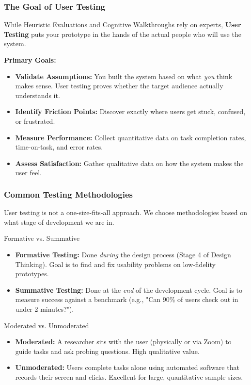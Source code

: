 \documentclass[xcolor=table]{beamer}
\begin{document}
\begin{frame}
    \frametitle{The Goal of User Testing}
    While Heuristic Evaluations and Cognitive Walkthroughs rely on experts, \textbf{User Testing} puts your prototype in the hands of the actual people who will use the system.
    
    \vspace{0.3cm}
    \textbf{Primary Goals:}
    \begin{itemize}
        \item \textbf{Validate Assumptions:} You built the system based on what \textit{you} think makes sense. User testing proves whether the target audience actually understands it.
        \item \textbf{Identify Friction Points:} Discover exactly where users get stuck, confused, or frustrated.
        \item \textbf{Measure Performance:} Collect quantitative data on task completion rates, time-on-task, and error rates.
        \item \textbf{Assess Satisfaction:} Gather qualitative data on how the system makes the user feel.
    \end{itemize}
\end{frame}

\begin{frame}[fragile]
    \frametitle{Common Testing Methodologies}
    User testing is not a one-size-fits-all approach. We choose methodologies based on what stage of development we are in.
    \footnotesize
    \vspace{0.2cm}
    \begin{block}{Formative vs. Summative}
        \begin{itemize}
            \item \textbf{Formative Testing:} Done \textit{during} the design process (Stage 4 of Design Thinking). Goal is to find and fix usability problems on low-fidelity prototypes.
            \item \textbf{Summative Testing:} Done at the \textit{end} of the development cycle. Goal is to measure success against a benchmark (e.g., "Can 90\% of users check out in under 2 minutes?").
        \end{itemize}
    \end{block}
    
    \begin{block}{Moderated vs. Unmoderated}
        \begin{itemize}
            \item \textbf{Moderated:} A researcher sits with the user (physically or via Zoom) to guide tasks and ask probing questions. High qualitative value.
            \item \textbf{Unmoderated:} Users complete tasks alone using automated software that records their screen and clicks. Excellent for large, quantitative sample sizes.
        \end{itemize}
    \end{block}
\end{frame}
\end{document}

